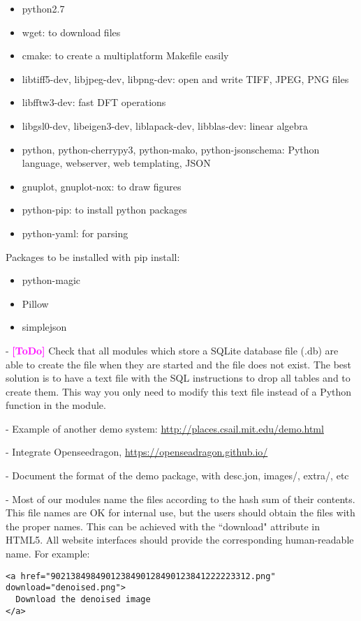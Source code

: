 \documentclass[a4paper,12pt]{article}
\newcommand{\ToDo}[1]{\textcolor{magenta}{\textbf{[ToDo]} \textbf{#1}}}
\begin{document}
\begin{itemize}
\item python2.7
\item wget: to download files
\item cmake: to create a multiplatform Makefile easily
\item libtiff5-dev, libjpeg-dev, libpng-dev: open and write TIFF, JPEG, PNG files
\item libfftw3-dev: fast DFT operations
\item libgsl0-dev, libeigen3-dev, liblapack-dev, libblas-dev: linear algebra
\item python, python-cherrypy3, python-mako, python-jsonschema: Python language, webserver, web templating, JSON
\item gnuplot, gnuplot-nox: to draw figures
\item python-pip: to install python packages
\item python-yaml: for parsing
\end{itemize}
Packages to be installed with pip install:
\begin{itemize}
\item python-magic
\item Pillow
\item simplejson
\end{itemize}

- \ToDo{} Check that all modules which store a SQLite database file (.db) are able to create the file when they are started and the file does not exist. The best solution is to have a text file with the SQL instructions to drop all  tables and to create them. This way you only need to modify this text file instead of a Python function in the module.

- Example of another demo system: \url{http://places.csail.mit.edu/demo.html}

- Integrate Openseedragon, \url{https://openseadragon.github.io/}

- Document the format of the demo package, with desc.jon, images/, extra/, etc

- Most of our modules name the files according to the hash sum of their contents. This file names are OK for internal use, but the users should obtain the files with the proper names. This can be achieved with the ``download" attribute in HTML5. All website interfaces should provide the corresponding human-readable name. For example:

\begin{verbatim}
<a href="9021384984901238490128490123841222223312.png" download="denoised.png">
  Download the denoised image
</a>
\end{verbatim}
\end{document}
